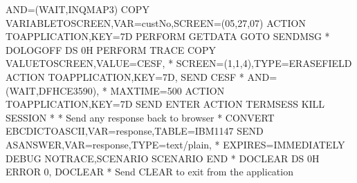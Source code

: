 \documentclass[letterpaper,10pt,english]{sphinxmanual}
\begin{document}
\begin{sphinxVerbatim}[commandchars=\\\{\}]
               AND=(WAIT,\PYGZsq{}INQMAP3\PYGZsq{})
         COPY\PYGZdl{} VARIABLE\PYGZhy{}TO\PYGZhy{}SCREEN,VAR=\PYGZsq{}custNo\PYGZsq{},SCREEN=(05,27,07)
         ACTION\PYGZdl{}  TO\PYGZhy{}APPLICATION,KEY=7D
         PERFORM\PYGZdl{} GETDATA
         GOTO\PYGZdl{} SENDMSG
*\PYGZus{}\PYGZus{}\PYGZus{}\PYGZus{}\PYGZus{}\PYGZus{}\PYGZus{}\PYGZus{}\PYGZus{}\PYGZus{}\PYGZus{}\PYGZus{}\PYGZus{}\PYGZus{}\PYGZus{}\PYGZus{}\PYGZus{}\PYGZus{}\PYGZus{}\PYGZus{}\PYGZus{}\PYGZus{}\PYGZus{}\PYGZus{}\PYGZus{}\PYGZus{}\PYGZus{}\PYGZus{}\PYGZus{}\PYGZus{}\PYGZus{}\PYGZus{}\PYGZus{}\PYGZus{}\PYGZus{}\PYGZus{}\PYGZus{}\PYGZus{}\PYGZus{}\PYGZus{}\PYGZus{}\PYGZus{}\PYGZus{}\PYGZus{}\PYGZus{}\PYGZus{}\PYGZus{}\PYGZus{}\PYGZus{}\PYGZus{}\PYGZus{}\PYGZus{}\PYGZus{}\PYGZus{}\PYGZus{}\PYGZus{}\PYGZus{}\PYGZus{}\PYGZus{}\PYGZus{}\PYGZus{}\PYGZus{}\PYGZus{}\PYGZus{}\PYGZus{}\PYGZus{}\PYGZus{}\PYGZus{}\PYGZus{}\PYGZus{}
DOLOGOFF DS   0H
         PERFORM\PYGZdl{} TRACE
         COPY\PYGZdl{} VALUE\PYGZhy{}TO\PYGZhy{}SCREEN,VALUE=\PYGZsq{}CESF\PYGZsq{},                           *
               SCREEN=(1,1,4),TYPE=ERASE\PYGZhy{}FIELD
         ACTION\PYGZdl{}  TO\PYGZhy{}APPLICATION,KEY=7D,           SEND CESF           *
               AND=(WAIT,\PYGZsq{}DFHCE3590\PYGZsq{}),                                 *
               MAXTIME=500
         ACTION\PYGZdl{}  TO\PYGZhy{}APPLICATION,KEY=7D            SEND ENTER
         ACTION\PYGZdl{} TERMSESS                          KILL SESSION
*
* Send any response back to browser
*
         CONVERT\PYGZdl{} EBCDIC\PYGZhy{}TO\PYGZhy{}ASCII,VAR=\PYGZsq{}response\PYGZsq{},TABLE=\PYGZsq{}IBM1147\PYGZsq{}
         SEND\PYGZdl{} AS\PYGZhy{}ANSWER,VAR=\PYGZsq{}response\PYGZsq{},TYPE=\PYGZsq{}text/plain\PYGZsq{},             *
               EXPIRES=IMMEDIATELY
         DEBUG\PYGZdl{} NOTRACE,SCENARIO
         SCENARIO END
*\PYGZus{}\PYGZus{}\PYGZus{}\PYGZus{}\PYGZus{}\PYGZus{}\PYGZus{}\PYGZus{}\PYGZus{}\PYGZus{}\PYGZus{}\PYGZus{}\PYGZus{}\PYGZus{}\PYGZus{}\PYGZus{}\PYGZus{}\PYGZus{}\PYGZus{}\PYGZus{}\PYGZus{}\PYGZus{}\PYGZus{}\PYGZus{}\PYGZus{}\PYGZus{}\PYGZus{}\PYGZus{}\PYGZus{}\PYGZus{}\PYGZus{}\PYGZus{}\PYGZus{}\PYGZus{}\PYGZus{}\PYGZus{}\PYGZus{}\PYGZus{}\PYGZus{}\PYGZus{}\PYGZus{}\PYGZus{}\PYGZus{}\PYGZus{}\PYGZus{}\PYGZus{}\PYGZus{}\PYGZus{}\PYGZus{}\PYGZus{}\PYGZus{}\PYGZus{}\PYGZus{}\PYGZus{}\PYGZus{}\PYGZus{}\PYGZus{}\PYGZus{}\PYGZus{}\PYGZus{}\PYGZus{}\PYGZus{}\PYGZus{}\PYGZus{}\PYGZus{}\PYGZus{}\PYGZus{}\PYGZus{}\PYGZus{}\PYGZus{}
DOCLEAR  DS   0H
         ERROR\PYGZdl{} 0,\PYGZsq{}\PYGZhy{}\PYGZhy{}\PYGZhy{} DOCLEAR\PYGZsq{}
* Send CLEAR to exit from the application

\end{sphinxVerbatim}
\end{document}
